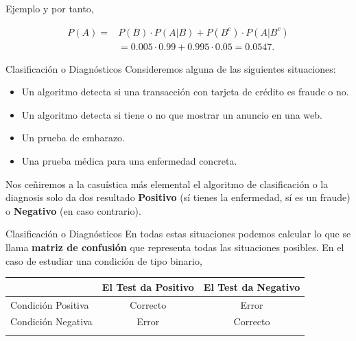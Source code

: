 \documentclass[
  ignorenonframetext,
  aspectratio=169]{beamer}
\providecommand{\tightlist}{%
  \setlength{\itemsep}{0pt}\setlength{\parskip}{0pt}}\usepackage{longtable,booktabs,array}
\begin{document}
\begin{frame}{Ejemplo}
\label{ejemplo-5}
y por tanto,

\[
\begin{array}{rl}
P(A)=& P(B)\cdot P(A|B)+P(B^c)\cdot P(A|B^c)\\
& =0.005\cdot 0.99+0.995\cdot 0.05=0.0547.
\end{array}
\]
\end{frame}

\begin{frame}{Clasificación o Diagnósticos}
\label{clasificaciuxf3n-o-diagnuxf3sticos}
Consideremos alguna de las siguientes situaciones:

\begin{itemize}
\tightlist
\item
  Un algoritmo detecta si una transacción con tarjeta de crédito es
  fraude o no.
\item
  Un algoritmo detecta si tiene o no que mostrar un anuncio en una web.
\item
  Un prueba de embarazo.
\item
  Una prueba médica para una enfermedad concreta.
\end{itemize}

Nos ceñiremos a la casuística más elemental el algoritmo de
clasificación o la diagnosis solo da dos resultado \textbf{Positivo} (sí
tienes la enfermedad, sí es un fraude) o \textbf{Negativo} (en caso
contrario).
\end{frame}

\begin{frame}{Clasificación o Diagnósticos}
\label{clasificaciuxf3n-o-diagnuxf3sticos-1}
En todas estas situaciones podemos calcular lo que se llama
\textbf{matriz de confusión} que representa todas las situaciones
posibles. En el caso de estudiar una condición de tipo binario,

\begin{longtable}[]{@{}lcc@{}}
\toprule\noalign{}
& El Test da Positivo & El Test da Negativo \\
\midrule\noalign{}
\endhead
Condición Positiva & Correcto & Error \\
Condición Negativa & Error & Correcto \\
\bottomrule\noalign{}
\end{longtable}
\end{frame}
\end{document}

